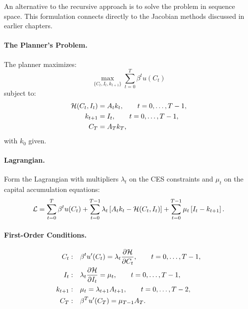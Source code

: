 An alternative to the recursive approach is to solve the problem in sequence space. This formulation connects directly to the Jacobian methods discussed in earlier chapters.

\paragraph{The Planner's Problem.}
The planner maximizes:
\begin{equation}
\max_{\{C_t, I_t, k_{t+1}\}} \sum_{t=0}^{T} \beta^t u(C_t)
\label{eq:ac-T-planner-obj}
\end{equation}
subject to:
\begin{align}
\mathcal{H}(C_t, I_t) &= A_t k_t, \qquad t = 0, \ldots, T-1, \label{eq:ac-T-planner-ces} \\
k_{t+1} &= I_t, \qquad t = 0, \ldots, T-1, \label{eq:ac-T-planner-accum} \\
C_T &= A_T k_T, \label{eq:ac-T-planner-terminal}
\end{align}
with $k_0$ given.

\paragraph{Lagrangian.}
Form the Lagrangian with multipliers $\lambda_t$ on the CES constraints and $\mu_t$ on the capital accumulation equations:
\begin{equation}
\mathcal{L} = \sum_{t=0}^{T} \beta^t u(C_t) + \sum_{t=0}^{T-1} \lambda_t \left[ A_t k_t - \mathcal{H}(C_t, I_t) \right] + \sum_{t=0}^{T-1} \mu_t \left[ I_t - k_{t+1} \right].
\label{eq:ac-T-lagrangian}
\end{equation}

\paragraph{First-Order Conditions.}
\begin{align}
C_t: & \quad \beta^t u'(C_t) = \lambda_t \frac{\partial \mathcal{H}}{\partial C_t}, \qquad t = 0, \ldots, T-1, \label{eq:ac-T-foc-C} \\
I_t: & \quad \lambda_t \frac{\partial \mathcal{H}}{\partial I_t} = \mu_t, \qquad t = 0, \ldots, T-1, \label{eq:ac-T-foc-I} \\
k_{t+1}: & \quad \mu_t = \lambda_{t+1} A_{t+1}, \qquad t = 0, \ldots, T-2, \label{eq:ac-T-foc-k} \\
C_T: & \quad \beta^T u'(C_T) = \mu_{T-1} A_T. \label{eq:ac-T-foc-CT}
\end{align}

